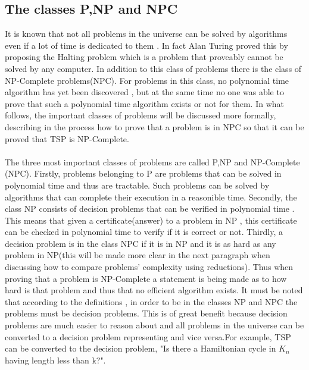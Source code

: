 \documentclass{article}
\begin{document}
\subsection{The classes P,NP and NPC}
It is known that not all problems in the universe can be solved by algorithms even if a lot of time is dedicated to them . In fact Alan Turing proved this by proposing the Halting problem which is a problem that proveably cannot be solved by any computer. In addition to this class of problems there is the class of NP-Complete problems(NPC). For problems in this class, no polynomial time algorithm has yet been discovered , but at the same time no one was able to prove that such a polynomial time algorithm exists or not for them. In what follows, the important classes of problems will be discussed more formally, describing in the process how to prove that a problem is in NPC so that it can be proved that TSP is NP-Complete. \cite{geeksforgeeks_2018_2}\\
\\
The three most important classes of problems are called P,NP and NP-Complete (NPC). Firstly, problems belonging to P are problems that can be solved in polynomial time and thus are tractable. Such problems can be solved by algorithms that can complete their execution in a reasonible time. Secondly, the class NP consists of decision problems that can be verified in polynomial time . This means that given a certificate(answer) to a problem in NP , this certificate can be checked in polynomial time to verify if it is correct or not. Thirdly, a decision problem is in the class NPC if it is in NP and it is as hard as any problem in NP(this will be made more clear in the next paragraph when discussing how to compare problems' complexity using reductions). Thus when proving that a problem is NP-Complete a statement is being made as to how hard is that problem and thus that no efficient algorithm exists. It must be noted that according to the definitions , in order to be in the classes NP and NPC the problems must be decision problems. This is of great benefit because decision problems are much easier to reason about and all problems in the universe can be converted to a decision problem representing and vice versa.For example, TSP can be converted to the decision problem, "Is there a Hamiltonian cycle in $K_n$ having length less than k?". \cite{cormen_leiserson_rivest_stein}\\
\\
\end{document}
